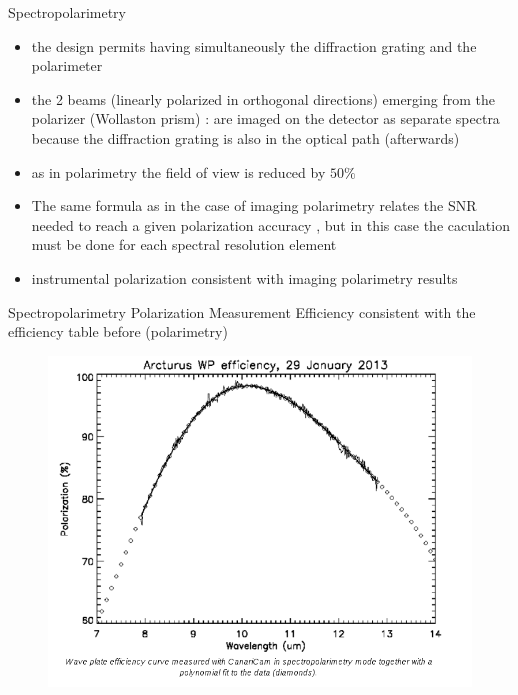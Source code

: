 \documentclass{beamer}
\begin{document}
\begin{frame}{Spectropolarimetry}
\begin{itemize}
\item the design permits having simultaneously the diffraction grating and the polarimeter
\item the 2 beams (linearly polarized in orthogonal directions) emerging from the polarizer (Wollaston prism) :  
are imaged on the detector as separate spectra because the diffraction grating is also in the optical path (afterwards)
\item as in polarimetry the field of view is reduced by $50\%$
\item The same formula as in the case of imaging polarimetry relates the SNR needed to reach a given polarization accuracy , 
but in this case the caculation must be done for each spectral resolution element
\item instrumental polarization consistent with imaging polarimetry results
\end{itemize}
\end{frame}

\begin{frame}{Spectropolarimetry}
Polarization Measurement Efficiency consistent with the efficiency table before (polarimetry)
\begin{figure}[H]
 \centering
 \includegraphics[scale=0.35]{img12.png}
\end{figure}
\end{frame}
\end{document}
